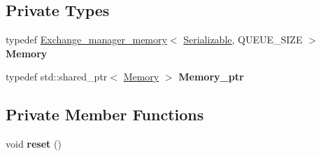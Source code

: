 \subsection*{Private Types}
\begin{DoxyCompactItemize}
\item 
typedef \hyperlink{classshared__memory_1_1internal_1_1Exchange__manager__memory}{Exchange\+\_\+manager\+\_\+memory}$<$ \hyperlink{classSerializable}{Serializable}, Q\+U\+E\+U\+E\+\_\+\+S\+I\+ZE $>$ {\bfseries Memory}\hypertarget{classshared__memory_1_1Exchange__manager__producer_a65119cf07c0c10f167c191c9ee913029}{}\label{classshared__memory_1_1Exchange__manager__producer_a65119cf07c0c10f167c191c9ee913029}

\item 
typedef std\+::shared\+\_\+ptr$<$ \hyperlink{classshared__memory_1_1internal_1_1Exchange__manager__memory}{Memory} $>$ {\bfseries Memory\+\_\+ptr}\hypertarget{classshared__memory_1_1Exchange__manager__producer_a7f3d7760ca2d1c01fa88e7a6447a38d7}{}\label{classshared__memory_1_1Exchange__manager__producer_a7f3d7760ca2d1c01fa88e7a6447a38d7}

\end{DoxyCompactItemize}
\subsection*{Private Member Functions}
\begin{DoxyCompactItemize}
\item 
void {\bfseries reset} ()\hypertarget{classshared__memory_1_1Exchange__manager__producer_a2148cfb2e9a1973089d81237ea5735b9}{}\label{classshared__memory_1_1Exchange__manager__producer_a2148cfb2e9a1973089d81237ea5735b9}

\end{DoxyCompactItemize}
